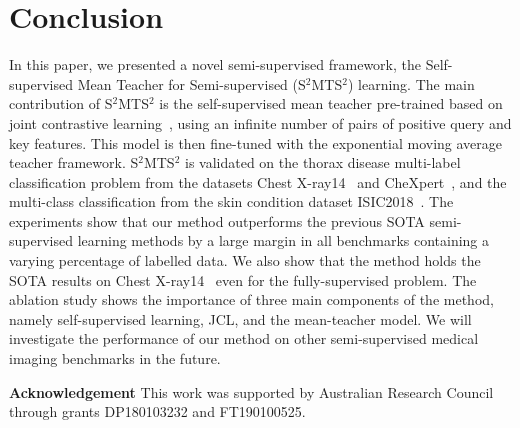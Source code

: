 \documentclass[runningheads]{llncs}
\begin{document}
\begin{table}[t!]
\centering
{}
\caption{Ablation studies of our method with different components on Chest X-Ray14. "Self-supervised" indicates the traditional self-supervised learning with contrastive loss~\cite{moco}. "JCL" replaces contrastive loss with ~\eqref{eq:loss_pre_train}, "MT" stands for fine-tuned with student-teacher learning instead only fine-tuned on only labelled samples.}\vspace{-.275in}

\label{tab:ablation}
\end{table}




\vspace{-.1in}
\section{Conclusion}
\vspace{-.1in}

In this paper, we presented a novel semi-supervised framework, the Self-supervised Mean Teacher for Semi-supervised (S$^2$MTS$^2$) learning.
The main contribution of S$^2$MTS$^2$ is the  self-supervised mean teacher pre-trained based on joint contrastive learning~\cite{cai2020joint}, using an infinite number of pairs of positive query and key features.
This model is then fine-tuned with the exponential moving average teacher framework.
S$^2$MTS$^2$ is validated on the thorax disease multi-label classification problem from the datasets
Chest X-ray14~\cite{wang2017chestx} and CheXpert~\cite{irvin2019chexpert}, and the multi-class classification from the skin condition dataset ISIC2018~\cite{tschandl2018ham10000, codella2019skin}. 
The experiments show that our method outperforms the previous SOTA semi-supervised learning methods by a large margin in all benchmarks containing a varying percentage of labelled data. 
We also show that the method holds the SOTA results on Chest X-ray14~\cite{wang2017chestx} even for the fully-supervised problem.
The ablation study shows the importance of three main components of the method, namely self-supervised learning, JCL, and the mean-teacher model. 
We will investigate the performance of our method on other semi-supervised medical imaging benchmarks in the future.

\textbf{Acknowledgement} This work was supported by Australian Research Council through grants DP180103232 and FT190100525.   





\end{document}
